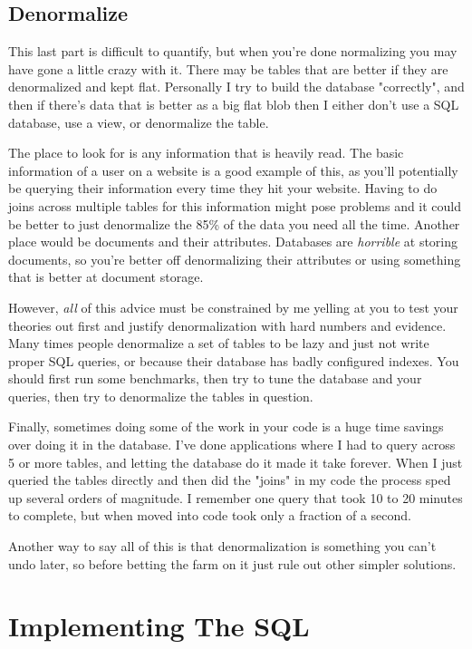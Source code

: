 \subsection{Denormalize}

This last part is difficult to quantify, but when you're done normalizing you may have 
gone a little crazy with it.  There may be tables that are better if they are denormalized
and kept flat.  Personally I try to build the database "correctly", and then if there's
data that is better as a big flat blob then I either don't use a SQL database, use a view,
or denormalize the table.

The place to look for is any information that is heavily read.  The basic information of
a user on a website is a good example of this, as you'll potentially be querying their
information every time they hit your website.  Having to do joins across multiple tables
for this information might pose problems and it could be better to just denormalize the
85\% of the data you need all the time.  Another place would be documents and their 
attributes.  Databases are \emph{horrible} at storing documents, so you're better off
denormalizing their attributes or using something that is better at document storage.

However, \emph{all} of this advice must be constrained by me yelling at you to test your
theories out first and justify denormalization with hard numbers and evidence.  Many times
people denormalize a set of tables to be lazy and just not write proper SQL queries, or because
their database has badly configured indexes.  You should first run some benchmarks, then
try to tune the database and your queries, then try to denormalize the tables in question.

Finally, sometimes doing some of the work in your code is a huge time savings over doing
it in the database.  I've done applications where I had to query across 5 or more tables,
and letting the database do it made it take forever.  When I just queried the tables directly
and then did the "joins" in my code the process sped up several orders of magnitude.  I remember
one query that took 10 to 20 minutes to complete, but when moved into code took only a 
fraction of a second.

Another way to say all of this is that denormalization is something you can't undo later,
so before betting the farm on it just rule out other simpler solutions.

\section{Implementing The SQL}


